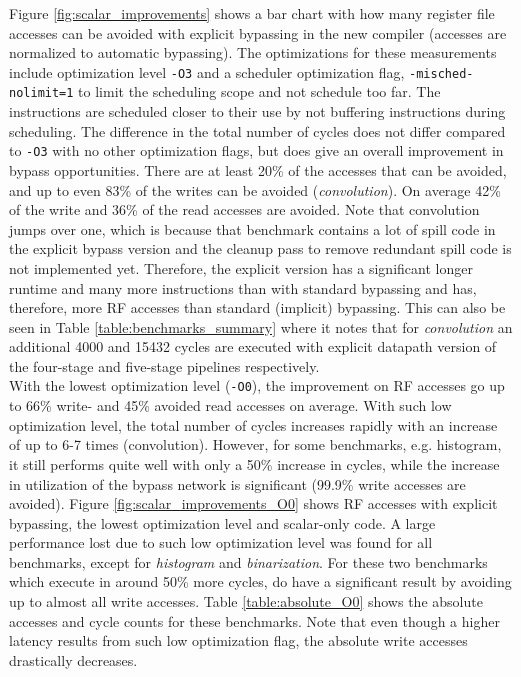 Figure \ref{fig:scalar_improvements} shows a bar chart with how many register file accesses can be avoided with explicit bypassing in the new compiler (accesses are normalized to automatic bypassing). The optimizations for these measurements include optimization level \texttt{-O3} and a scheduler optimization flag, \texttt{-misched-nolimit=1} to limit the scheduling scope and not schedule too far. The instructions are scheduled closer to their use by not buffering instructions during scheduling. The difference in the total number of cycles does not differ compared to \texttt{-O3} with no other optimization flags, but does give an overall improvement in bypass opportunities. There are at least 20\% of the accesses that can be avoided, and up to even 83\% of the writes can be avoided (\emph{convolution}). On average 42\% of the write and 36\% of the read accesses are avoided. Note that convolution jumps over one, which is because that benchmark contains a lot of spill code in the explicit bypass version and the cleanup pass to remove redundant spill code is not implemented yet. Therefore, the explicit version has a significant longer runtime and many more instructions than with standard bypassing and has, therefore, more RF accesses than standard (implicit) bypassing. This can also be seen in Table \ref{table:benchmarks_summary} where it notes that for \emph{convolution} an additional 4000 and 15432 cycles are executed with explicit datapath version of the four-stage and five-stage pipelines respectively.\\

With the lowest optimization level (\texttt{-O0}), the improvement on RF accesses go up to 66\% write- and 45\% avoided read accesses on average. With such low optimization level, the total number of cycles increases rapidly with an increase of up to 6-7 times (convolution). However, for some benchmarks, e.g. histogram, it still performs quite well with only a 50\% increase in cycles, while the increase in utilization of the bypass network is significant (99.9\% write accesses are avoided). Figure \ref{fig:scalar_improvements_O0} shows RF accesses with explicit bypassing, the lowest optimization level and scalar-only code. A large performance lost due to such low optimization level was found for all benchmarks, except for \emph{histogram} and \emph{binarization}. For these two benchmarks which execute in around 50\% more cycles, do have a significant result by avoiding up to almost all write accesses. Table \ref{table:absolute_O0} shows the absolute accesses and cycle counts for these benchmarks. Note that even though a higher latency results from such low optimization flag, the absolute write accesses drastically decreases.



